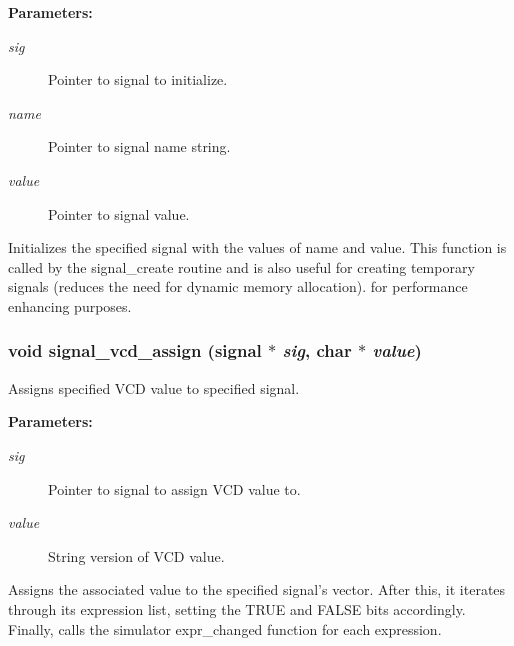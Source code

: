 \begin{Desc}
\item[{\bf Parameters: }]\par
\begin{description}
\item[
{\em sig}]Pointer to signal to initialize. \item[
{\em name}]Pointer to signal name string. \item[
{\em value}]Pointer to signal value.

\end{description}
\end{Desc}
Initializes the specified signal with the values of name and value. This function is called by the signal\_\-create routine and is also useful for creating temporary signals (reduces the need for dynamic memory allocation). for performance enhancing purposes. 
\subsubsection{\setlength{\rightskip}{0pt plus 5cm}void signal\_\-vcd\_\-assign ({\bf signal} $\ast$ {\em sig}, char $\ast$ {\em value})}\label{signal_8h_a5}


Assigns specified VCD value to specified signal.

\begin{Desc}
\item[{\bf Parameters: }]\par
\begin{description}
\item[
{\em sig}]Pointer to signal to assign VCD value to. \item[
{\em value}]String version of VCD value.

\end{description}
\end{Desc}
Assigns the associated value to the specified signal's vector. After this, it iterates through its expression list, setting the TRUE and FALSE bits accordingly. Finally, calls the simulator expr\_\-changed function for each expression. 